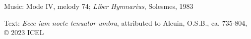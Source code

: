


\medskip\begin{hymnsource}
Music: Mode IV, melody 74; \emph{Liber Hymnarius}, Solesmes, 1983

Text: \emph{Ecce iam nocte tenuator umbra}, attributed to Alcuin, O.S.B., ca. 735-804, © 2023 ICEL
\end{hymnsource}
